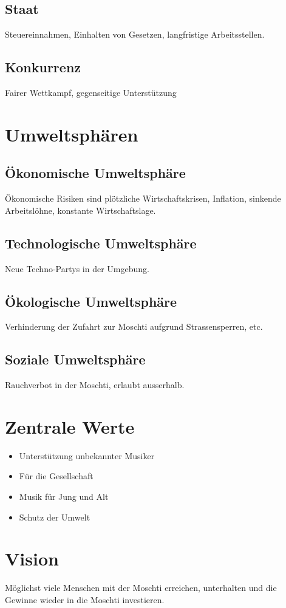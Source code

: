 \documentclass[a4paper, titlepage]{article}
\begin{document}
\subsection{Staat}
Steuereinnahmen, Einhalten von Gesetzen, langfristige Arbeitsstellen.
\subsection{Konkurrenz}
Fairer Wettkampf, gegenseitige Unterstützung

\section{Umweltsphären}
\subsection{Ökonomische Umweltsphäre}
Ökonomische Risiken sind plötzliche Wirtschaftskrisen, Inflation, sinkende Arbeitslöhne, 
konstante Wirtschaftslage.
\subsection{Technologische Umweltsphäre}
Neue Techno-Partys in der Umgebung.
\subsection{Ökologische Umweltsphäre}
Verhinderung der Zufahrt zur Moschti aufgrund Strassensperren, etc.
\subsection{Soziale Umweltsphäre}
Rauchverbot in der Moschti, erlaubt ausserhalb. 
\section{Zentrale Werte}
\begin{itemize}
  \item Unterstützung unbekannter Musiker
  \item Für die Gesellschaft
  \item Musik für Jung und Alt
  \item Schutz der Umwelt
\end{itemize}
\section{Vision}
Möglichst viele Menschen mit der Moschti erreichen, unterhalten und die Gewinne wieder in die Moschti investieren. 
\end{document}
